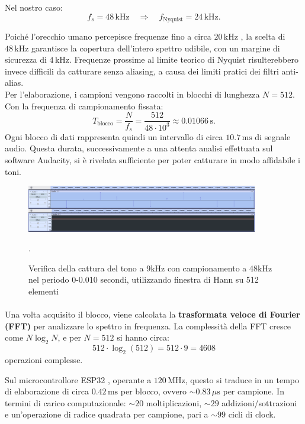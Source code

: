 Nel nostro caso:
\[
f_s = 48\,\text{kHz} \quad \Rightarrow \quad f_{\text{Nyquist}} = 24\,\text{kHz}.
\]

Poiché l’orecchio umano percepisce frequenze fino a circa $20\,\text{kHz}$ \citep{zwicker1999psychoacoustics}, la scelta di $48\,\text{kHz}$ garantisce la copertura dell’intero spettro udibile, con un margine di sicurezza di $4\,\text{kHz}$. Frequenze prossime al limite teorico di Nyquist risulterebbero invece difficili da catturare senza aliasing, a causa dei limiti pratici dei filtri anti-alias. \\

\noindent
Per l’elaborazione, i campioni vengono raccolti in blocchi di lunghezza $N = 512$. Con la frequenza di campionamento fissata:
\[
T_{\text{blocco}} = \frac{N}{f_s} = \frac{512}{48 \cdot 10^3} \approx 0.01066\,\text{s}.
\]
Ogni blocco di dati rappresenta quindi un intervallo di circa $10.7\,\text{ms}$ di segnale audio.  
Questa durata, successivamente a una attenta analisi effettuata sul software Audacity, si è rivelata sufficiente per poter catturare in modo affidabile i toni.
\begin{figure}[H]
    \centering
    \includegraphics[width=0.9\textwidth]{immagini/audacity_spectrum.png}
    \caption{Verifica della cattura del tono a 9kHz con campionamento a 48kHz nel periodo 0-0.010 secondi, utilizzando finestra di Hann su 512 elementi}.
    \label{fig:spettro_audacity}
\end{figure}


\paragraph{}
\label{par: fft_calcolo}
\noindent
Una volta acquisito il blocco, viene calcolata la \textbf{trasformata veloce di Fourier (FFT)} \citep{cooley1965fft} per analizzare lo spettro in frequenza. La complessità della FFT cresce come $N \log_2 N$, e per $N=512$ si hanno circa:
\[
512 \cdot \log_2(512) = 512 \cdot 9 = 4608
\]
operazioni complesse.  

Sul microcontrollore ESP32 \citep{esp32techref}, operante a $120\,\text{MHz}$, questo si traduce in un tempo di elaborazione di circa $0.42\,\text{ms}$ per blocco, ovvero $\sim 0.83\,\mu\text{s}$ per campione. In termini di carico computazionale: $\sim 20$ moltiplicazioni, $\sim 29$ addizioni/sottrazioni e un’operazione di radice quadrata per campione, pari a $\sim 99$ cicli di clock.  


